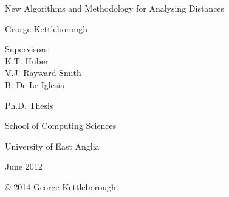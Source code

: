 \documentclass[a4paper,12pt]{report}
\title{\reporttitle}
\author{\reportauthor}
\newcommand{\reporttitle}{New Algorithms and Methodology for Analysing
  Distances}
\newcommand{\reportauthor}{George Kettleborough}
\newcommand{\0}{{\emptyset}}
\begin{document}

\begin{titlepage}
\begin{center}
\vspace*{1in}
{\LARGE \reporttitle}
\par
\vspace{1.5in}
{\large \reportauthor}
\par
\vspace{.3in}
{ Supervisors:\\
K.T. Huber\\
V.J. Rayward-Smith\\
B. De Le Iglesia}
\par
\vfill
Ph.D. Thesis
\par
\vspace{0.5in}
School of Computing Sciences
\par
\vspace{0.5in}
University of East Anglia
\par
\vspace{0.5in}
June 2012
\par
\vspace{0.5in}
© 2014 George Kettleborough.
\end{center}
\end{titlepage}

\newpage
\end{document}
